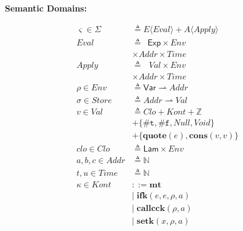 \documentclass[12pt,draft]{article}
\newcommand{\truesyn}{\texttt{\#t}}
\newcommand{\falsesyn}{\texttt{\#f}}
\begin{document}
{\begin{multicols*}{2}
\vfill\null
\columnbreak


\begin{center}
\textbf{Semantic Domains:}
\end{center}
\vspace{-18mm}
\begin{center}
\begin{align*}
\varsigma \in \Sigma &\triangleq E\langle\textit{Eval}\rangle
								+ A\langle\textit{Apply}\rangle \\
\textit{Eval} &\triangleq \:\;\textsf{Exp} \times \textit{Env} \\
						& \times \textit{Addr} \times \textit{Time} \\
\textit{Apply} &\triangleq \:\;\,\textit{Val} \times \textit{Env} \\
						& \times \textit{Addr} \times \textit{Time} \\
\rho \in \textit{Env} &\triangleq \textsf{Var} \rightharpoonup
												\textit{Addr} \\
\sigma \in \textit{Store} &\triangleq \textit{Addr} \rightharpoonup
													\textit{Val} \\
v \in \textit{Val} &\triangleq \textit{Clo} + \textit{Kont} + \mathbb{Z} \\
				&+ \{ \truesyn,\falsesyn, \textit{Null} , \textit{Void} \} \\
				&+ \{\textbf{quote}(e) , \textbf{cons}(v, v)\} \\
clo \in \textit{Clo} &\triangleq \textsf{Lam} \times \textit{Env} \\
a,b,c \in \textit{Addr} &\triangleq \mathbb{N} \\
t,u \in \textit{Time} &\triangleq \mathbb{N} \\
\kappa \in \textit{Kont} &::= \textbf{mt} \\
        &|\; \textbf{ifk}(e, e, \rho, a) \\
        &|\; \textbf{callcck}(\rho, a) \\
        &|\; \textbf{setk}(x, \rho, a) \\

\end{align*}
\end{center}
\end{multicols*}}
\end{document}
